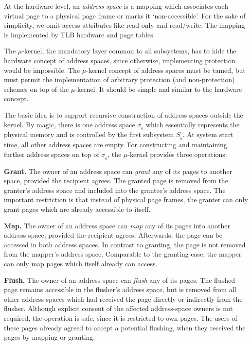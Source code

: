 \documentclass[a4paper,11pt,twoside,dvips]{book}
\newcommand{\micro}{$\mu$}
\begin{document}
At the hardware level, an {\em address space} is a mapping which associates
each virtual page to a physical page frame or marks it `non-accessible'. For
the sake of simplicity, we omit access attributes like read-only and read/write.
The mapping is implemented by TLB hardware and page tables. 
 
The \micro-kernel, the mandatory layer common to all subsystems, has to hide
the hardware concept of address spaces, since otherwise, implementing
protection would be impossible. The \micro-kernel concept of address spaces
must be tamed, but must permit the implementation of arbitrary protection
(and
non-protection) schemes on top of the \micro-kernel. It should be simple and
similar to the hardware concept. 
 
The basic idea is to support recursive construction of address spaces outside
the kernel. By magic, there is one address space $\sigma_{_0}$ which
essentially represents the physical memory and is controlled by the first
subsystem $S_{_0}$. At system start time, all other address spaces are
empty. For constructing and maintaining further address spaces on top of
$\sigma_{_0}$, the \micro-kernel provides three operations: 
% 
\begin{list}{}{ 
               \setlength{\leftmargin}{0pt}
               \setlength{\labelwidth}{0pt}
               \addtolength{\labelwidth}{-\labelsep} 
               } 
\item[\bf Grant.] The owner of an address space can {\em grant} any of its pages
         to another space, provided the recipient agrees. The granted page
         is removed from the granter's address space and included into the
         grantee's address space. The important
         restriction is that instead of physical page frames, the
         granter can only grant pages which are already accessible to
         itself. 
% 
\item[\bf Map.] The owner of an address space can {\em map} any of its pages
         into another address space, provided the recipient agrees.
         Afterwards,
         the page can be accessed in both address spaces. In contrast
         to granting, the page is not removed from the mapper's address
         space. Comparable to the granting case, the
         mapper can only map pages which itself already can access. 
% 
\item[\bf Flush.] The owner of an address space can {\em flush} any of its pages. 
         The flushed page remains accessible in the flusher's address space,
         but is removed from all other address spaces which had
         received the page directly or indirectly from the flusher.
         Although explicit consent of the affected address-space owners is
         not required, the operation is safe, since it is restricted to own
         pages. The users of these pages already agreed to accept a potential
         flushing, when they received the pages by mapping or granting. 
\end{list} 
 
\end{document}
